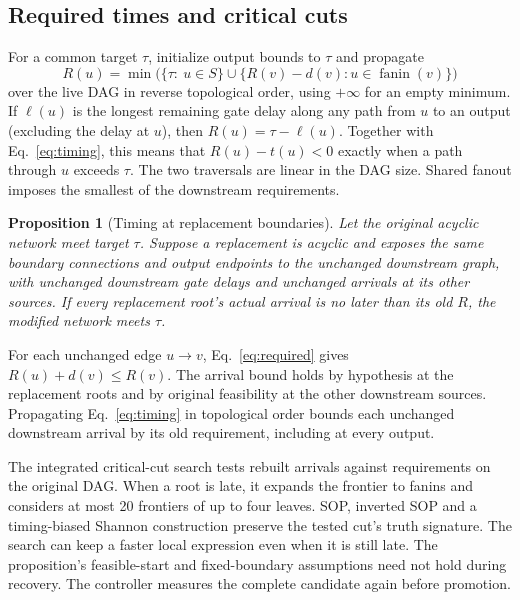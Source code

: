\documentclass[journal,10pt]{IEEEtran}
\newtheorem{proposition}{Proposition}
\begin{document}
\subsection{Required times and critical cuts}
For a common target \(\tau\), initialize output bounds to \(\tau\) and propagate
\begin{equation}
 R(u)=\min\bigl(\{\tau:\ u\in S\}\cup
              \{R(v)-d(v): u\in\operatorname{fanin}(v)\}\bigr)
 \label{eq:required}
\end{equation}
over the live DAG in reverse topological order, using \(+\infty\) for an empty minimum. If \(\ell(u)\) is the longest remaining gate delay along any path from \(u\) to an output (excluding the delay at \(u\)), then \(R(u)=\tau-\ell(u)\). Together with Eq.~\eqref{eq:timing}, this means that \(R(u)-t(u)<0\) exactly when a path through \(u\) exceeds \(\tau\). The two traversals are linear in the DAG size. Shared fanout imposes the smallest of the downstream requirements.

\begin{proposition}[Timing at replacement boundaries]
Let the original acyclic network meet target \(\tau\). Suppose a replacement is acyclic and exposes the same boundary connections and output endpoints to the unchanged downstream graph, with unchanged downstream gate delays and unchanged arrivals at its other sources. If every replacement root's actual arrival is no later than its old \(R\), the modified network meets \(\tau\).
\end{proposition}
\begin{IEEEproof}
For each unchanged edge \(u\to v\), Eq.~\eqref{eq:required} gives \(R(u)+d(v)\le R(v)\). The arrival bound holds by hypothesis at the replacement roots and by original feasibility at the other downstream sources. Propagating Eq.~\eqref{eq:timing} in topological order bounds each unchanged downstream arrival by its old requirement, including at every output.
\end{IEEEproof}

The integrated critical-cut search tests rebuilt arrivals against requirements on the original DAG. When a root is late, it expands the frontier to fanins and considers at most 20 frontiers of up to four leaves. SOP, inverted SOP and a timing-biased Shannon construction preserve the tested cut's truth signature. The search can keep a faster local expression even when it is still late. The proposition's feasible-start and fixed-boundary assumptions need not hold during recovery. The controller measures the complete candidate again before promotion.
\end{document}
